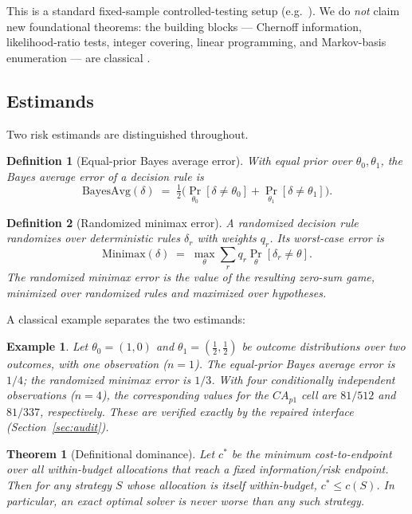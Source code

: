 \documentclass[11pt]{article}
\newtheorem{theorem}{Theorem}
\newtheorem{definition}{Definition}
\newtheorem{example}{Example}
\begin{document}
This is a standard fixed-sample controlled-testing setup (e.g.\ \cite{nitinawarat2013controlled,kartik2022fixed}). We do \emph{not} claim new foundational theorems: the building blocks --- Chernoff information, likelihood-ratio tests, integer covering, linear programming, and Markov-basis enumeration --- are classical \cite{chernoff1972sequential,wald1945sequential,hoeffding1963probability,moret1985minimizing,diaconis1998algebraic}.

\subsection{Estimands}\label{sec:estimands}

Two risk estimands are distinguished throughout.

\begin{definition}[Equal-prior Bayes average error]\label{def:bayes}
With equal prior over $\theta_0,\theta_1$, the Bayes average error of a decision rule is
\[
\mathrm{BayesAvg}(\delta) \;=\; \tfrac12\Big(\Pr_{\theta_0}[\delta\neq\theta_0]+\Pr_{\theta_1}[\delta\neq\theta_1]\Big).
\]
\end{definition}

\begin{definition}[Randomized minimax error]\label{def:minimax}
A randomized decision rule randomizes over deterministic rules $\delta_r$ with weights $q_r$. Its worst-case error is
\[
\mathrm{Minimax}(\delta) \;=\; \max_{\theta} \sum_r q_r \Pr_{\theta}[\delta_r\neq \theta].
\]
The \emph{randomized minimax error} is the value of the resulting zero-sum game, minimized over randomized rules and maximized over hypotheses.
\end{definition}

A classical example separates the two estimands:

\begin{example}\label{ex:classic}
Let $\theta_0=(1,0)$ and $\theta_1=(\tfrac12,\tfrac12)$ be outcome distributions over two outcomes, with one observation ($n=1$). The equal-prior Bayes average error is $1/4$; the randomized minimax error is $1/3$. With four conditionally independent observations ($n=4$), the corresponding values for the $CA_{p1}$ cell are $81/512$ and $81/337$, respectively. These are verified exactly by the repaired interface (Section~\ref{sec:audit}).
\end{example}

\begin{theorem}[Definitional dominance]\label{thm:dominance}
Let $c^\ast$ be the minimum cost-to-endpoint over \emph{all} within-budget allocations that reach a fixed information/risk endpoint. Then for any strategy $S$ whose allocation is itself within-budget, $c^\ast \le c(S)$. In particular, an exact optimal solver is never worse than any such strategy.
\end{theorem}
\end{document}
